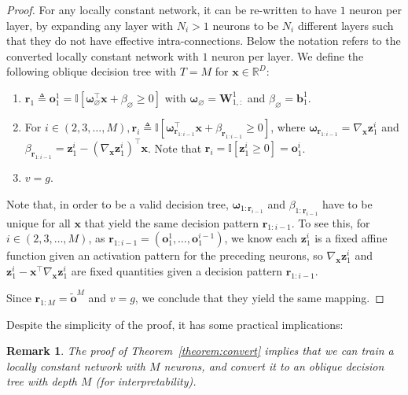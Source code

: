 \documentclass{article} \usepackage{iclr2020_conference,times}
\newtheorem{remark}[theorem]{Remark}
\def\vb{{\bm{b}}}
\def\vo{{\bm{o}}}
\def\vr{{\bm{r}}}
\def\vomega{{\bm{\omega}}}
\def\vx{{\bm{x}}}
\def\vz{{\bm{z}}}
\def\mW{{\bm{W}}}
\def\sR{{\mathbb{R}}}
\newcommand{\one}{\mathbb{I}}
\begin{document}
\begin{proof}
\vspace{-2mm}
For any locally constant network, it can be re-written to have $1$ neuron per layer, by expanding any layer with $N_i > 1$ neurons to be $N_i$ different layers such that they do not have effective intra-connections. 
Below the notation refers to the converted locally constant network with $1$ neuron per layer. 
We define the following oblique decision tree with $T=M$ for $\vx \in \sR^D$:
\begin{enumerate}
\vspace{-2mm}
    \item $\vr_1 \triangleq \vo^1_1 = \one [ \vomega_{\varnothing}^\top \vx + \beta_{\varnothing} \geq 0]$ with $ \vomega_{\varnothing} = \mW^1_{1,:}$ and $\beta_\varnothing = \vb^1_1$.\!\!\!\!
\vspace{-1mm}
    \item For $i \in (2,3,\dots,M), \vr_i \triangleq \one [ \vomega_{\vr_{1:i-1}}^\top \vx + \beta_{\vr_{1:i-1}} \geq 0]$, where $\vomega_{\vr_{1:i-1}} = \nabla_\vx \vz^i_1$ and $\beta_{\vr_{1:i-1}} = \vz^i_1 - (\nabla_\vx \vz^i_1)^\top \vx$. Note that $\vr_i = \one[ \vz^i_1 \geq 0] = \vo^i_1$.
\vspace{-1mm}
    \item $v = g$.
\vspace{-2mm}
\end{enumerate}
Note that, in order to be a valid decision tree, $\vomega_{1:\vr_{i-1}}$ and $\beta_{1:\vr_{i-1}}$ have to be unique for all $\vx$ that yield the same decision pattern $\vr_{1:i-1}$. To see this, for $i \in (2,3,\dots,M)$, as $\vr_{1:i-1} = (\vo^1_1,\dots,\vo^{i-1}_1)$, we know each $\vz^i_1$ is a fixed affine function given an activation pattern for the preceding neurons, so $\nabla_\vx \vz^i_1$ and $\vz^i_1 - \vx^\top \nabla_\vx \vz^i_1$ are fixed quantities given a decision pattern $\vr_{1:i-1}$. 

Since $\vr_{1:M} = \tilde \vo^M$ and $v = g$, we conclude that they yield the same mapping. 
\end{proof}
\vspace{-2mm}
Despite the simplicity of the proof, it has some practical implications:
\begin{remark}\label{remark:equivalence}
The proof of Theorem~\ref{theorem:convert} implies that we can train a locally constant network with $M$ neurons, and convert it to an oblique decision tree with depth $M$ (for interpretability).
\vspace{-1mm}
\end{remark}
\end{document}
